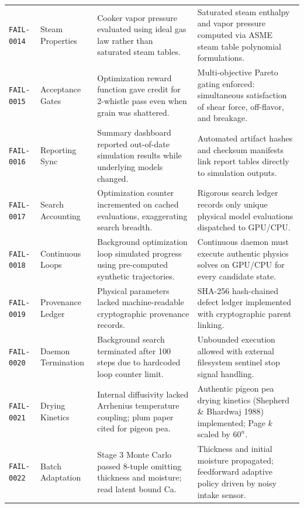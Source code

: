 \documentclass[10pt,a4paper]{article}
\begin{document}
\begin{longtable}{p{1.7cm}p{3.2cm}p{4.2cm}>{\raggedright\arraybackslash}p{6.5cm}}
\texttt{FAIL-0014} & Steam Properties & Cooker vapor pressure evaluated using ideal gas law rather than saturated steam tables. & Saturated steam enthalpy and vapor pressure computed via ASME steam table polynomial formulations. \\

\texttt{FAIL-0015} & Acceptance Gates & Optimization reward function gave credit for 2-whistle pass even when grain was shattered. & Multi-objective Pareto gating enforced: simultaneous satisfaction of shear force, off-flavor, and breakage. \\

\texttt{FAIL-0016} & Reporting Sync & Summary dashboard reported out-of-date simulation results while underlying models changed. & Automated artifact hashes and checksum manifests link report tables directly to simulation outputs. \\

\texttt{FAIL-0017} & Search Accounting & Optimization counter incremented on cached evaluations, exaggerating search breadth. & Rigorous search ledger records only unique physical model evaluations dispatched to GPU/CPU. \\

\texttt{FAIL-0018} & Continuous Loops & Background optimization loop simulated progress using pre-computed synthetic trajectories. & Continuous daemon must execute authentic physics solves on GPU/CPU for every candidate state. \\

\texttt{FAIL-0019} & Provenance Ledger & Physical parameters lacked machine-readable cryptographic provenance records. & SHA-256 hash-chained defect ledger implemented with cryptographic parent linking. \\

\texttt{FAIL-0020} & Daemon Termination & Background search terminated after 100 steps due to hardcoded loop counter limit. & Unbounded execution allowed with external filesystem sentinel stop signal handling. \\

\texttt{FAIL-0021} & Drying Kinetics & Internal diffusivity lacked Arrhenius temperature coupling; plum paper cited for pigeon pea. & Authentic pigeon pea drying kinetics (Shepherd \& Bhardwaj 1988) implemented; Page $k$ scaled by $60^n$. \\

\texttt{FAIL-0022} & Batch Adaptation & Stage 3 Monte Carlo passed 8-tuple omitting thickness and moisture; read latent bound Ca. & Thickness and initial moisture propagated; feedforward adaptive policy driven by noisy intake sensor. \\


\end{longtable}
\end{document}

